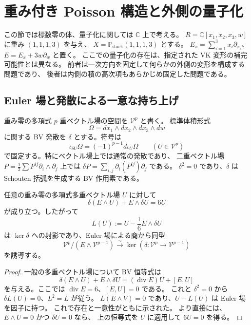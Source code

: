 \section{重み付き Poisson 構造と外側の量子化}
\label{sec:weighted-poisson-v31}

この節では標数零の体、量子化に関しては $\mathbb C$ 上で考える。
$R=\mathbb C[x_1,x_2,x_3,w]$ に重み $(1,1,1,3)$ を与え、
$X=\mathbb P_{\mathrm{stack}}(1,1,1,3)$ とする。
$E_x=\sum_{i=1}^3x_i\partial_{x_i}$、$E=E_x+3w\partial_w$ と置く。
ここでの量子化の存在は、指定された VK 変形の補完可能性とは異なる。
前者は一次方向を固定して何らかの外側の変形を構成する問題であり、
後者は内側の積の高次項もあらかじめ固定した問題である。

\subsection{Euler 場と発散による一意な持ち上げ}

重み零の多項式 $p$ 重ベクトル場の空間を $\mathcal V^p$ と書く。
標準体積形式
\[
 \Omega=dx_1\wedge dx_2\wedge dx_3\wedge dw
\]
に関する BV 発散を $\delta$ とする。符号は
\[
 \iota_{\delta U}\Omega=(-1)^{p-1}d\iota_U\Omega
 \qquad(U\in\mathcal V^p)
\]
で固定する。特にベクトル場上では通常の発散であり、
二重ベクトル場 $P=\frac12\sum P^{ij}\partial_i\wedge\partial_j$
上では $\delta P=\sum_{i,j}\partial_i(P^{ij})\partial_j$ である。
$\delta^2=0$ であり、$\delta$ は Schouten 括弧を生成する BV 作用素である。

\begin{lemma}
\label{lem:weighted-euler-homotopy-v31}
任意の重み零の多項式多重ベクトル場 $U$ に対して
\[
 \delta(E\wedge U)+E\wedge\delta U=6U
\]
が成り立つ。したがって
\[
 L(U):=U-\frac16E\wedge\delta U
\]
は $\ker\delta$ への射影であり、Euler 場による商から同型
\[
 \mathcal V^p/(E\wedge\mathcal V^{p-1})
 \xrightarrow{\ \sim\ }
 \ker(\delta:\mathcal V^p\longrightarrow\mathcal V^{p-1})
\]
を誘導する。
\end{lemma}

\begin{proof}
一般の多重ベクトル場について BV 恒等式は
\[
 \delta(E\wedge U)+E\wedge\delta U
 =(\operatorname{div}E)U+[E,U]
\]
を与える。ここでは $\operatorname{div}E=6$、$[E,U]=0$ である。
これと $\delta^2=0$ から $\delta L(U)=0$、$L^2=L$ が従う。
$L(E\wedge V)=0$ であり、$U-L(U)$ は Euler 場を因子に持つ。
これで存在と一意性がともに示された。
より直接には、$E\wedge U=0$ かつ $\delta U=0$ なら、
上の恒等式を $U$ に適用して $6U=0$ を得る。
\end{proof}

